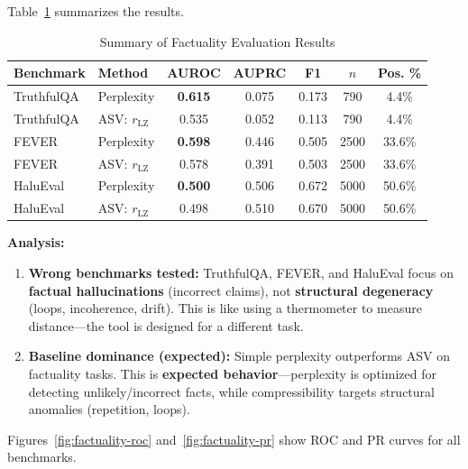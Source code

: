 \documentclass[11pt]{article}
\begin{document}
Table~\ref{tab:factuality-results} summarizes the results.

\begin{table}[h]
\centering
\caption{Summary of Factuality Evaluation Results}
\label{tab:factuality-results}
\begin{tabular}{llccccc}
\toprule
\textbf{Benchmark} & \textbf{Method} & \textbf{AUROC} & \textbf{AUPRC} & \textbf{F1} & $n$ & \textbf{Pos. \%} \\
\midrule
TruthfulQA & Perplexity & \textbf{0.615} & 0.075 & 0.173 & 790 & 4.4\% \\
TruthfulQA & ASV: $r_{\text{LZ}}$ & 0.535 & 0.052 & 0.113 & 790 & 4.4\% \\
\midrule
FEVER & Perplexity & \textbf{0.598} & 0.446 & 0.505 & 2500 & 33.6\% \\
FEVER & ASV: $r_{\text{LZ}}$ & 0.578 & 0.391 & 0.503 & 2500 & 33.6\% \\
\midrule
HaluEval & Perplexity & \textbf{0.500} & 0.506 & 0.672 & 5000 & 50.6\% \\
HaluEval & ASV: $r_{\text{LZ}}$ & 0.498 & 0.510 & 0.670 & 5000 & 50.6\% \\
\bottomrule
\end{tabular}
\end{table}

\textbf{Analysis:}
\begin{enumerate}
\item \textbf{Wrong benchmarks tested:} TruthfulQA, FEVER, and HaluEval focus on \textbf{factual hallucinations} (incorrect claims), not \textbf{structural degeneracy} (loops, incoherence, drift). This is like using a thermometer to measure distance---the tool is designed for a different task.
\item \textbf{Baseline dominance (expected):} Simple perplexity outperforms ASV on factuality tasks. This is \textbf{expected behavior}---perplexity is optimized for detecting unlikely/incorrect facts, while compressibility targets structural anomalies (repetition, loops).
\end{enumerate}

Figures~\ref{fig:factuality-roc} and~\ref{fig:factuality-pr} show ROC and PR curves for all benchmarks.
\end{document}
